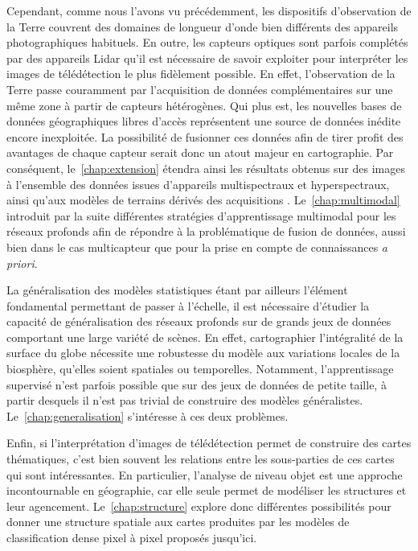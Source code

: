 Cependant, comme nous l'avons vu précédemment, les dispositifs d'observation de la Terre couvrent des domaines de longueur d'onde bien différents des appareils photographiques habituels. En outre, les capteurs optiques sont parfois complétés par des appareils Lidar qu'il est nécessaire de savoir exploiter pour interpréter les images de télédétection le plus fidèlement possible. En effet, l'observation de la Terre passe couramment par l'acquisition de données complémentaires sur une même zone à partir de capteurs hétérogènes. Qui plus est, les nouvelles bases de données géographiques libres d'accès représentent une source de données inédite encore inexploitée. La possibilité de fusionner ces données afin de tirer profit des avantages de chaque capteur serait donc un atout majeur en cartographie. Par conséquent, le~\cref{chap:extension} étendra ainsi les résultats obtenus sur des images  à l'ensemble des données issues d'appareils multispectraux et hyperspectraux, ainsi qu'aux modèles de terrains dérivés des acquisitions . Le~\cref{chap:multimodal} introduit par la suite différentes stratégies d'apprentissage multimodal pour les réseaux profonds afin de répondre à la problématique de fusion de données, aussi bien dans le cas multicapteur que pour la prise en compte de connaissances \emph{a priori}.

La généralisation des modèles statistiques étant par ailleurs l'élément fondamental permettant de passer à l'échelle, il est nécessaire d'étudier la capacité de généralisation des réseaux profonds sur de grands jeux de données comportant une large variété de scènes. En effet, cartographier l'intégralité de la surface du globe nécessite une robustesse du modèle aux variations locales de la biosphère, qu'elles soient spatiales ou temporelles. Notamment, l'apprentissage supervisé n'est parfois possible que sur des jeux de données de petite taille, à partir desquels il n'est pas trivial de construire des modèles généralistes. Le~\cref{chap:generalisation} s'intéresse à ces deux problèmes.

Enfin, si l'interprétation d'images de télédétection permet de construire des cartes thématiques, c'est bien souvent les relations entre les sous-parties de ces cartes qui sont intéressantes. En particulier, l'analyse de niveau objet est une approche incontournable en géographie, car elle seule permet de modéliser les structures et leur agencement. Le~\cref{chap:structure} explore donc différentes possibilités pour donner une structure spatiale aux cartes produites par les modèles de classification dense pixel à pixel proposés jusqu'ici.

